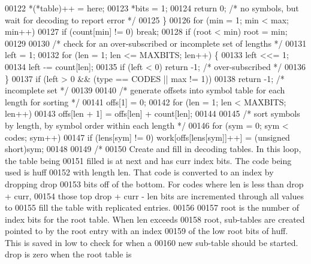 \begin{DoxyCode}
00122         *(*table)++ = here;
00123         *bits = 1;
00124         \textcolor{keywordflow}{return} 0;     \textcolor{comment}{/* no symbols, but wait for decoding to report error */}
00125     \}
00126     \textcolor{keywordflow}{for} (min = 1; min < max; min++)
00127         \textcolor{keywordflow}{if} (count[min] != 0) \textcolor{keywordflow}{break};
00128     \textcolor{keywordflow}{if} (root < min) root = min;
00129 
00130     \textcolor{comment}{/* check for an over-subscribed or incomplete set of lengths */}
00131     left = 1;
00132     \textcolor{keywordflow}{for} (len = 1; len <= MAXBITS; len++) \{
00133         left <<= 1;
00134         left -= count[len];
00135         \textcolor{keywordflow}{if} (left < 0) \textcolor{keywordflow}{return} -1;        \textcolor{comment}{/* over-subscribed */}
00136     \}
00137     \textcolor{keywordflow}{if} (left > 0 && (type == CODES || max != 1))
00138         \textcolor{keywordflow}{return} -1;                      \textcolor{comment}{/* incomplete set */}
00139 
00140     \textcolor{comment}{/* generate offsets into symbol table for each length for sorting */}
00141     offs[1] = 0;
00142     \textcolor{keywordflow}{for} (len = 1; len < MAXBITS; len++)
00143         offs[len + 1] = offs[len] + count[len];
00144 
00145     \textcolor{comment}{/* sort symbols by length, by symbol order within each length */}
00146     \textcolor{keywordflow}{for} (sym = 0; sym < codes; sym++)
00147         \textcolor{keywordflow}{if} (lens[sym] != 0) work[offs[lens[sym]]++] = (\textcolor{keywordtype}{unsigned} short)sym;
00148 
00149     \textcolor{comment}{/*}
00150 \textcolor{comment}{       Create and fill in decoding tables.  In this loop, the table being}
00151 \textcolor{comment}{       filled is at next and has curr index bits.  The code being used is huff}
00152 \textcolor{comment}{       with length len.  That code is converted to an index by dropping drop}
00153 \textcolor{comment}{       bits off of the bottom.  For codes where len is less than drop + curr,}
00154 \textcolor{comment}{       those top drop + curr - len bits are incremented through all values to}
00155 \textcolor{comment}{       fill the table with replicated entries.}
00156 \textcolor{comment}{}
00157 \textcolor{comment}{       root is the number of index bits for the root table.  When len exceeds}
00158 \textcolor{comment}{       root, sub-tables are created pointed to by the root entry with an index}
00159 \textcolor{comment}{       of the low root bits of huff.  This is saved in low to check for when a}
00160 \textcolor{comment}{       new sub-table should be started.  drop is zero when the root table is}

\end{DoxyCode}
